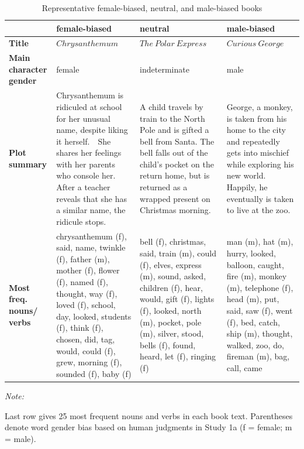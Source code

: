 \documentclass[
  english,
  ,man,floatsintext]{apa6}
\begin{document}
\begin{table}

\caption{\label{tab:bookexampletable}Representative female-biased, neutral, and male-biased books}
\centering
\begin{threeparttable}
\begin{tabular}[t]{>{\raggedright\arraybackslash}p{4.9em}>{\raggedright\arraybackslash}p{10em}>{\raggedright\arraybackslash}p{10em}>{\raggedright\arraybackslash}p{10em}}
\toprule
\textbf{} & \textbf{female-biased} & \textbf{neutral} & \textbf{male-biased}\\
\midrule
\textbf{Title} & $Chrysanthemum$ & $The\ Polar\ Express$ & $Curious\ George$\\
\addlinespace\addlinespace
\textbf{Main character gender} & female & indeterminate & male\\
\addlinespace\addlinespace
\textbf{Plot summary} & Chrysanthemum is ridiculed at school for her unusual name, despite liking it herself.  She shares her feelings with her parents who console her. After a teacher reveals that she has a similar name, the ridicule stops. & A child travels by train to the North Pole and is gifted a bell from Santa. The bell falls out of the child's pocket on the return home, but is returned as a wrapped present on Christmas morning. & George, a monkey, is taken from his home to the city and repeatedly gets into mischief while exploring his new world. Happily, he eventually is  taken to live at the zoo.\\
\addlinespace\addlinespace
\textbf{Most freq. nouns/ verbs} & chrysanthemum (f), said, name, twinkle (f), father (m), mother (f), flower (f), named (f), thought, way (f), loved (f), school, day, looked, students (f), think (f), chosen, did, tag, would, could (f), grew, morning (f), sounded (f), baby (f) & bell (f), christmas, said, train (m), could (f), elves, express (m), sound, asked, children (f), hear, would, gift (f), lights (f), looked, north (m), pocket, pole (m), silver, stood, bells (f), found, heard, let (f), ringing (f) & man (m), hat (m), hurry, looked, balloon, caught, fire (m), monkey (m), telephone (f), head (m), put, said, saw (f), went (f), bed, catch, ship (m), thought, walked, zoo, do, fireman (m), bag, call, came\\
\bottomrule
\end{tabular}
\begin{tablenotes}[para]
\item \textit{Note: } 
\item  Last row gives 25 most frequent nouns and verbs in each book text. Parentheses denote word gender bias based on human judgments in Study 1a (f = female; m = male).
\end{tablenotes}
\end{threeparttable}
\end{table}
\end{document}
